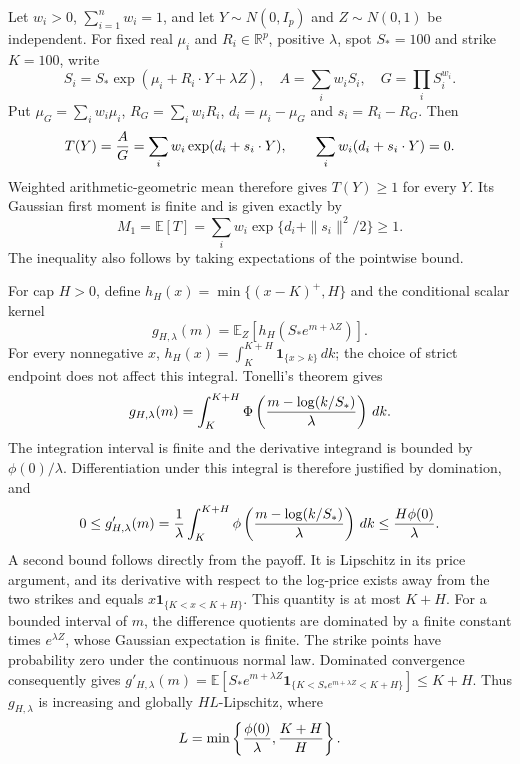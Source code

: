 Let $w_i>0$, $\sum_{i=1}^n w_i=1$, and let $Y\sim N(0,I_p)$ and
$Z\sim N(0,1)$ be independent. For fixed real $\mu_i$ and $R_i\in\mathbb R^p$,
positive $\lambda$, spot $S_*=100$ and strike $K=100$, write
\[
 S_i=S_*\exp(\mu_i+R_i\cdot Y+\lambda Z),\quad
 A=\sum_iw_iS_i,\quad G=\prod_iS_i^{w_i}.
\]
Put $\mu_G=\sum_iw_i\mu_i$, $R_G=\sum_iw_iR_i$,
$d_i=\mu_i-\mu_G$ and $s_i=R_i-R_G$. Then
\[
 T(Y)={A\over G}=\sum_iw_i\exp(d_i+s_i\cdot Y),
 \qquad \sum_iw_i(d_i+s_i\cdot Y)=0.
\]
Weighted arithmetic-geometric mean therefore gives $T(Y)\geq1$ for every
$Y$. Its Gaussian first moment is finite and is given exactly by
\begin{equation}
 M_1=\mathbb E[T]=\sum_iw_i\exp\{d_i+\|s_i\|^2/2\}\geq1.
 \label{eq:hierarchy-ratio-first-moment}
\end{equation}
The inequality also follows by taking expectations of the pointwise bound.

For cap $H>0$, define $h_H(x)=\min\{(x-K)^+,H\}$ and the conditional scalar
kernel
\[
 g_{H,\lambda}(m)=\mathbb E_Z[h_H(S_*e^{m+\lambda Z})].
\]
For every nonnegative $x$,
$h_H(x)=\int_K^{K+H}\mathbf1_{\{x>k\}}\,dk$; the choice of strict endpoint
does not affect this integral. Tonelli's theorem gives
\[
 g_{H,\lambda}(m)=\int_K^{K+H}
 \Phi\left({m-\log(k/S_*)\over\lambda}\right)\,dk.
\]
The integration interval is finite and the derivative integrand is bounded
by $\phi(0)/\lambda$. Differentiation under this integral is therefore
justified by domination, and
\[
 0\leq g'_{H,\lambda}(m)
 ={1\over\lambda}\int_K^{K+H}
 \phi\left({m-\log(k/S_*)\over\lambda}\right)\,dk
 \leq {H\phi(0)\over\lambda}.
\]
A second bound follows directly from the payoff. It is Lipschitz in its
price argument, and its derivative with respect to the log-price exists
away from the two strikes and equals
$x\mathbf1_{\{K<x<K+H\}}$. This quantity is at most $K+H$. For a bounded
interval of $m$, the difference quotients are dominated by a finite
constant times $e^{\lambda Z}$, whose Gaussian expectation is finite.
The strike points have probability zero under the continuous normal law.
Dominated convergence consequently gives
$g'_{H,\lambda}(m)=\mathbb E[S_*e^{m+\lambda Z}
\mathbf1_{\{K<S_*e^{m+\lambda Z}<K+H\}}]\leq K+H$.
Thus $g_{H,\lambda}$ is increasing and globally $H L$-Lipschitz, where
\begin{equation}
 L=\min\left\{{\phi(0)\over\lambda},{K+H\over H}\right\}.
 \label{eq:hierarchy-log-lipschitz}
\end{equation}

